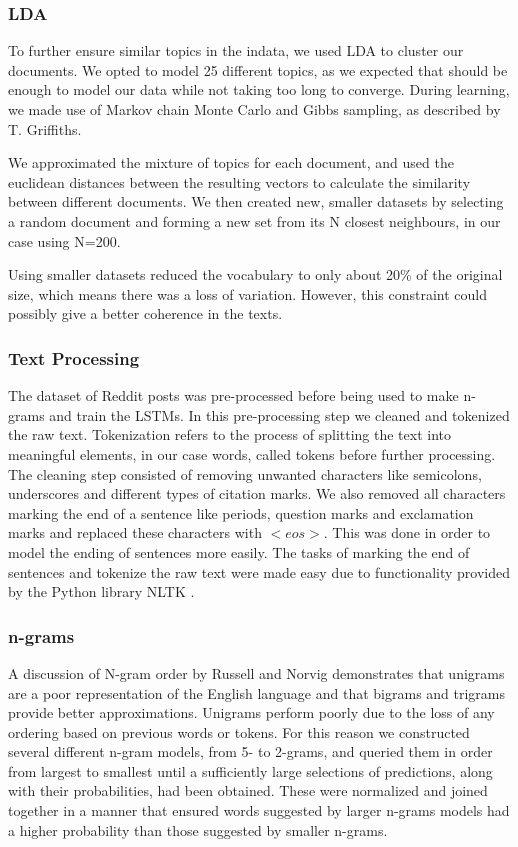 \documentclass[12pt,a4paper,utf8]{article}
\begin{document}
\subsubsection{LDA}
To further ensure similar topics in the indata, we used LDA to cluster our documents. We opted to model 25 different topics, as we expected that should be enough to model our data while not taking too long to converge. During learning, we made use of Markov chain Monte Carlo and Gibbs sampling, as described by T. Griffiths\cite{griffiths2002gibbs}.

We approximated the mixture of topics for each document, and used the euclidean distances between the resulting vectors to calculate the similarity between different documents. We then created new, smaller datasets by selecting a random document and forming a new set from its N closest neighbours, in our case using N=200.

Using smaller datasets reduced the vocabulary to only about 20\% of the original size, which means there was a loss of variation. However, this constraint could possibly give a better coherence in the texts. 

\subsubsection{Text Processing}
The dataset of Reddit posts was pre-processed before being used to make n-grams
and train the LSTMs. In this pre-processing step we cleaned and tokenized the
raw text. Tokenization refers to the process of splitting the text into
meaningful elements, in our case words, called tokens before further processing. 
The cleaning step consisted of removing unwanted characters
like semicolons, underscores and different types of citation marks.
We also removed all characters marking the end of a sentence like periods,
question marks and exclamation marks and replaced these characters with
$<eos>$. This was done in order to model the ending of sentences more easily.
The tasks of marking the end of sentences and tokenize the raw text were made 
easy due to functionality provided by the Python library NLTK \cite{NLTK}.

\subsubsection{n-grams}
A discussion of N-gram order by Russell and Norvig\autocite{AiModernApproach} demonstrates that unigrams are a poor representation of the English language and that bigrams and trigrams provide better approximations. Unigrams perform poorly due to the loss of any ordering based on previous words or tokens. For this reason we constructed several different n-gram models, from 5- to 2-grams, and queried them in order from largest to smallest until a sufficiently large selections of predictions, along with their probabilities, had been obtained. These were normalized and joined together in a manner that ensured words suggested by larger n-grams models had a higher probability than those suggested by smaller n-grams.
\end{document}
